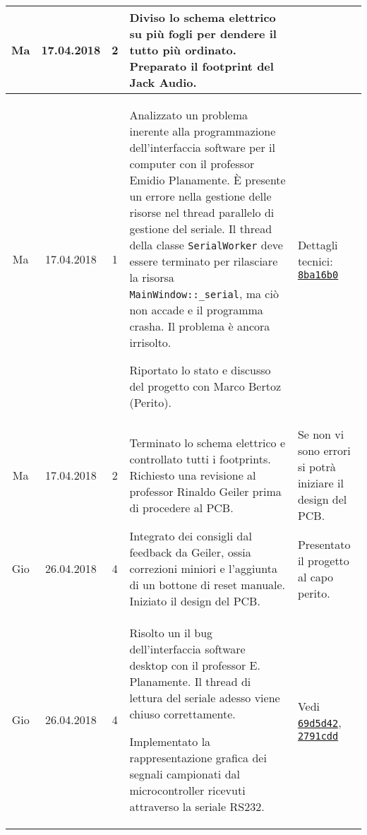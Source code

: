 \documentclass[a4paper]{article}
\newcommand{\journalentry}[5]{%
    #1 & #2 & #3 & #4 & #5 \\\hline
}
\begin{document}
\begin{tabularx}{\textwidth}{| c | c | c | p{} | X |}
        \journalentry{Ma}{17.04.2018}{2}{
            Diviso lo schema elettrico su pi\`u fogli per dendere il tutto pi\`u
            ordinato. Preparato il footprint del Jack Audio.
        }{}

        \journalentry{Ma}{17.04.2018}{1}{
            Analizzato un problema inerente alla programmazione dell'interfaccia
            software per il computer con il professor Emidio Planamente.
            \`E presente un errore nella gestione delle risorse nel thread
            parallelo di gestione del seriale. Il thread della classe 
            \texttt{SerialWorker} deve essere terminato per rilasciare la
            risorsa \texttt{MainWindow::\_serial}, ma ci\`o non accade e il 
            programma crasha. Il problema \`e ancora irrisolto.

            Riportato lo stato e discusso del progetto con Marco Bertoz (Perito).
        }{
            Dettagli tecnici:
            \href{https://github.com/NaoPross/SAMSpectrumAnalyzer/commit/8ba16b0f28e1724b825c14b6c3788319a617a718}{\texttt{8ba16b0}}
        }

        \journalentry{Ma}{17.04.2018}{2}{
            Terminato lo schema elettrico e controllato tutti i footprints.
            Richiesto una revisione al professor Rinaldo Geiler prima di 
            procedere al PCB.
        }{
            Se non vi sono errori si potr\`a iniziare il design del PCB.
        }


        \journalentry{Gio}{26.04.2018}{4}{
            Integrato dei consigli dal feedback da Geiler, ossia correzioni
            miniori e l'aggiunta di un bottone di reset manuale.
            Iniziato il design del PCB.
        }{
            Presentato il progetto al capo perito.
        }

        \journalentry{Gio}{26.04.2018}{4}{
            Risolto un il bug dell'interfaccia software desktop con il professor
            E. Planamente. Il thread di lettura del seriale adesso viene chiuso
            correttamente.

            Implementato la rappresentazione grafica dei segnali campionati
            dal microcontroller ricevuti attraverso la seriale RS232.
        }{
            Vedi
            \href{https://github.com/NaoPross/SAMSpectrumAnalyzer/commit/69d5d425552a9eecee7f168bfa8912061e4dd876}{\texttt{69d5d42}},
            \href{https://github.com/NaoPross/SAMSpectrumAnalyzer/commit/2791cdd30ab13738704171205abc46ea239e9e02}{\texttt{2791cdd}}
        }


    \end{tabularx}
\end{document}
